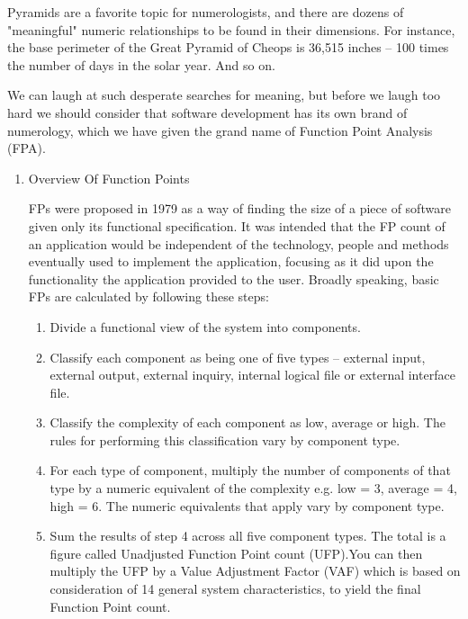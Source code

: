 \documentclass{article}
\begin{document}
Pyramids are a favorite topic for numerologists, and there are dozens of
"meaningful" numeric relationships to be found in their dimensions. For
instance, the base perimeter of the Great Pyramid of Cheops is 36,515
inches -- 100 times the number of days in the solar year. And so on.

We can laugh at such desperate searches for meaning, but before we laugh
too hard we should consider that software development has its own brand
of numerology, which we have given the grand name of Function Point
Analysis (FPA).

\begin{enumerate}
\item Overview Of Function Points
\label{sec:orgheadline380}

FPs were proposed in 1979 as a way of finding the size of a piece of
software given only its functional specification. It was intended that
the FP count of an application would be independent of the technology,
people and methods eventually used to implement the application,
focusing as it did upon the functionality the application provided to
the user. Broadly speaking, basic FPs are calculated by following these
steps:

\begin{enumerate}
\item Divide a functional view of the system into components.
\item Classify each component as being one of five types -- external input,
external output, external inquiry, internal logical file or external
interface file.\\
\item Classify the complexity of each component as low, average or high.
The rules for performing this classification vary by component
type.\\
\item For each type of component, multiply the number of components of that
type by a numeric equivalent of the complexity e.g. low = 3, average
= 4, high = 6. The numeric equivalents that apply vary by component
type.\\
\item Sum the results of step 4 across all five component types. The total
is a figure called Unadjusted Function Point count (UFP).You can then
multiply the UFP by a Value Adjustment Factor (VAF) which is based on
consideration of 14 general system characteristics, to yield the
final Function Point count.
\end{enumerate}


\end{enumerate}
\end{document}
